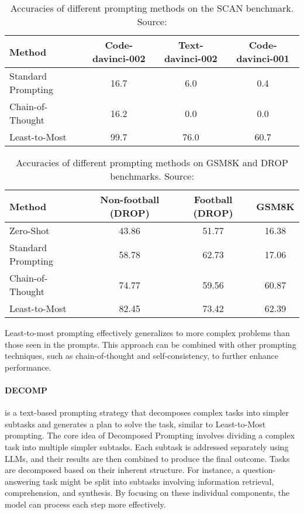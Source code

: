 \begin{table}[h!]
	\centering
	\begin{tabularx}{\textwidth}{Xccc}
		\hline
		\textbf{Method}    & \textbf{Code-davinci-002} & \textbf{Text-davinci-002} & \textbf{Code-davinci-001} \\
		\hline
		Standard Prompting & 16.7                      & 6.0                       & 0.4                       \\
		Chain-of-Thought   & 16.2                      & 0.0                       & 0.0                       \\
		Least-to-Most      & 99.7                      & 76.0                      & 60.7                      \\
		\hline
	\end{tabularx}
	\caption{Accuracies of different prompting methods on the SCAN benchmark. Source: \textcite{zhou2022least}}
	\label{tab:compositional}
\end{table}
\begin{table}[h!]
	\centering
	\begin{tabularx}{\textwidth}{Xccc}
		\hline
		\textbf{Method}    & \textbf{Non-football (DROP)} & \textbf{Football (DROP)} & \textbf{GSM8K} \\
		\hline
		Zero-Shot          & 43.86                        & 51.77                    & 16.38          \\
		Standard Prompting & 58.78                        & 62.73                    & 17.06          \\
		Chain-of-Thought   & 74.77                        & 59.56                    & 60.87          \\
		Least-to-Most      & 82.45                        & 73.42                    & 62.39          \\
		\hline
	\end{tabularx}
	\caption{Accuracies of different prompting methods on GSM8K and DROP benchmarks. Source: \textcite{zhou2022least}}
	\label{tab:math}
\end{table}

Least-to-most prompting effectively generalizes to more complex problems than those seen in the prompts.
This approach can be combined with other prompting techniques, such as chain-of-thought and self-consistency, to further enhance performance.


\paragraph{DECOMP}
\label{par:decomp}
is a text-based prompting strategy that decomposes complex tasks into simpler subtasks and generates a plan to solve the task, similar to Least-to-Most prompting.
The core idea of Decomposed Prompting involves dividing a complex task into multiple simpler subtasks.
Each subtask is addressed separately using LLMs, and their results are then combined to produce the final outcome.
Tasks are decomposed based on their inherent structure.
For instance, a question-answering task might be split into subtasks involving information retrieval, comprehension, and synthesis.
By focusing on these individual components, the model can process each step more effectively.

